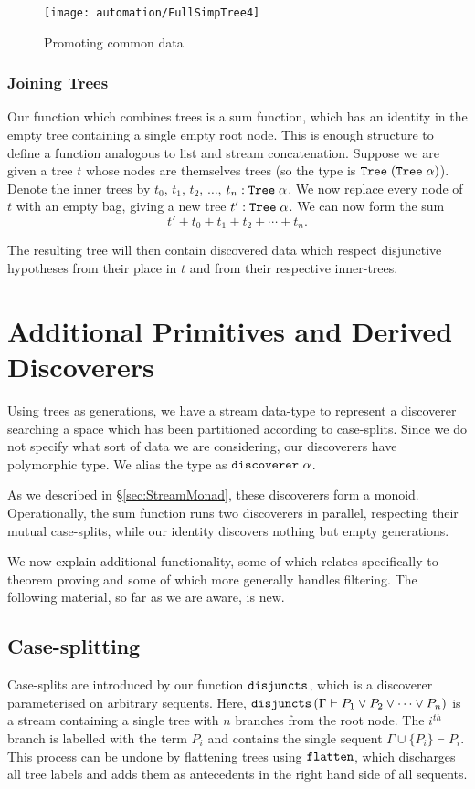 \begin{figure}
\centering\texttt{[image: automation/FullSimpTree4]}
\caption{Promoting common data}
\label{fig:TreePromoting}
\end{figure}

\subsubsection{Joining Trees}
Our function which combines trees is a sum function, which has an identity in the empty tree containing a single empty root node. This is enough structure to define a  function analogous to list and stream concatenation. Suppose we are given a tree $t$ whose nodes are themselves trees (so the type is $\texttt{Tree}\;(\texttt{Tree}\; \alpha)$). Denote the inner trees by $t_0$, $t_1$, $t_2$, $\ldots$, $t_n : \texttt{Tree}\;\alpha$. We now replace every node of $t$ with an empty bag, giving a new tree $t' : \texttt{Tree}\;\alpha$. We can now form the sum 
\begin{displaymath}
t' + t_0 + t_1 + t_2 + \cdots + t_n.
\end{displaymath}

The resulting tree will then contain discovered data which respect disjunctive hypotheses from their place in $t$ and from their respective inner-trees.

\section{Additional Primitives and Derived Discoverers}\label{sec:Additional}
Using trees as generations, we have a stream data-type to represent a discoverer searching a space which has been partitioned according to case-splits. Since we do not specify what sort of data we are considering, our discoverers have polymorphic type. We alias the type as $\texttt{discoverer}\ \alpha$. 

As we described in \S\ref{sec:StreamMonad}, these discoverers form a monoid. Operationally, the sum function runs two discoverers in parallel, respecting their mutual case-splits, while our identity discovers nothing but empty generations.

We now explain additional functionality, some of which relates specifically to theorem proving and some of which more generally handles filtering. The following material, so far as we are aware, is new.

\subsection{Case-splitting}
Case-splits are introduced by our function $\texttt{disjuncts}$, which is a discoverer parameterised on arbitrary sequents. Here, $\texttt{disjuncts}\left(\Gamma \vdash P_1 \vee P_2 \vee \cdots \vee P_n\right)$ is a stream containing a single tree with $n$ branches from the root node. The $i^{th}$ branch is labelled with the term $P_i$ and contains the single sequent $\Gamma \cup \{P_i\} \vdash P_i$. This process can be undone by flattening trees using $\texttt{flatten}$, which discharges all tree labels and adds them as antecedents in the right hand side of all sequents.

